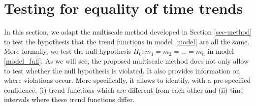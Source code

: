 \documentclass[a4paper,12pt]{article}
\begin{document}
\section{Testing for equality of time trends}\label{sec-test-equality}

In this section, we adapt the multiscale method developed in Section \ref{sec-method} to test the hypothesis that the trend functions in model \eqref{model} are all the same. More formally, we test the null hypothesis $H_0: m_1 = m_2 = \ldots = m_n$ in model \eqref{model_full}. As we will see, the proposed multiscale method does not only allow to test whether the null hypothesis is violated. It also provides information on where violations occur. More specifically, it allows to identify, with a pre-specified confidence, (i) trend functions which are different from each other and (ii) time intervals where these trend functions differ.
\end{document}

